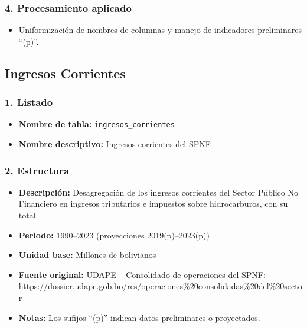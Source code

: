 \documentclass[12pt,a4paper]{article}
\begin{document}
\subsubsection*{4. Procesamiento aplicado}
\begin{itemize}
  \item Uniformización de nombres de columnas y manejo de indicadores preliminares “(p)”.
\end{itemize}

\subsection{Ingresos Corrientes}

\subsubsection*{1. Listado}
\begin{itemize}
  \item \textbf{Nombre de tabla:} \texttt{ingresos\_corrientes}
  \item \textbf{Nombre descriptivo:} Ingresos corrientes del SPNF
\end{itemize}

\subsubsection*{2. Estructura}
\begin{itemize}
  \item \textbf{Descripción:} Desagregación de los ingresos corrientes del Sector Público No Financiero en ingresos tributarios e impuestos sobre hidrocarburos, con su total.
  \item \textbf{Periodo:} 1990–2023 (proyecciones 2019(p)–2023(p))
  \item \textbf{Unidad base:} Millones de bolivianos
  \item \textbf{Fuente original:} UDAPE – Consolidado de operaciones del SPNF:\\
    \url{https://dossier.udape.gob.bo/res/operaciones%20consolidadas%20del%20sector}
  \item \textbf{Notas:} Los sufijos “(p)” indican datos preliminares o proyectados.
\end{itemize}
\end{document}
